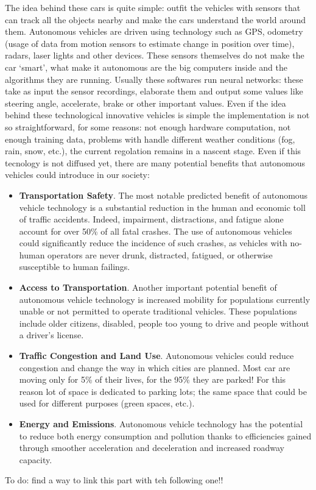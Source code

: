 \documentclass[14pt]{extarticle}
\def\ss{\vspace{25pt}}
\def\pp{\vspace{10pt}\newline}
\def\ppn{\vspace{10pt}}
\begin{document}
\begin{flushleft}
\ppn
The idea behind these cars is quite simple: outfit the vehicles with sensors that can track all the objects nearby and make the cars understand the world around them. Autonomous vehicles are driven using technology such as GPS, odometry (usage of data from motion sensors to estimate change in position over time), radars, laser lights and other devices\cite{AVlevels2}. These sensors themselves do not make the car ‘smart’, what make it autonomous are the big computers inside and the algorithms they are running. Usually these softwares run neural networks: these take as input the sensor recordings, elaborate them and output some values like steering angle, accelerate, brake or other important values. Even if the idea behind these technological innovative vehicles is simple the implementation is not so straightforward, for some reasons: not enough hardware computation, not enough training data, problems with handle different weather conditions (fog, rain, snow, etc.),  the current regolation remains in a nascent stage.
 \pp
Even if this tecnology is not diffused yet, there are many potential benefits that autonomous vehicles could introduce in our society:
 \begin{itemize}
 \item \textbf{Transportation Safety}. The most notable predicted benefit of autonomous vehicle technology is a substantial reduction in the human and economic toll of traffic accidents. Indeed, impairment, distractions, and fatigue alone account for over 50\% of all fatal crashes. The use of autonomous vehicles could significantly reduce the incidence of such crashes, as vehicles with no-human operators are never drunk, distracted, fatigued, or otherwise susceptible to human failings.
\item \textbf{Access to Transportation}. Another important potential benefit of autonomous vehicle technology is increased mobility for populations currently unable or not permitted to operate traditional vehicles. These populations include older
citizens, disabled, people too young to drive and people without a driver’s 
license.
\item \textbf{Traffic Congestion and Land Use}. Autonomous vehicles could reduce congestion and change the way in which cities are planned. Most car are moving only for 5\% of their lives, for the 95\% they are parked\cite{AVparking}! For this reason lot of space is dedicated to parking lots; the same space that could be used for different purposes (green spaces, etc.).
\item \textbf{Energy and Emissions}. Autonomous vehicle technology has the potential to reduce both energy consumption and pollution thanks to efficiencies gained through smoother acceleration and deceleration and  increased  roadway capacity.\cite{AVbenefit}
 \end{itemize}
 
 To do: find a way to link this part with teh following one!!

	\ss
\end{flushleft}
\end{document}
